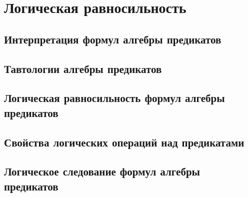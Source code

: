 \section{Логическая равносильность}
\subsection{Интерпретация формул алгебры предикатов}
\subsection{Тавтологии алгебры предикатов}
\subsection{Логическая равносильность формул алгебры предикатов}
\subsection{Свойства логических операций над предикатами}
\subsection{Логическое следование формул алгебры предикатов}